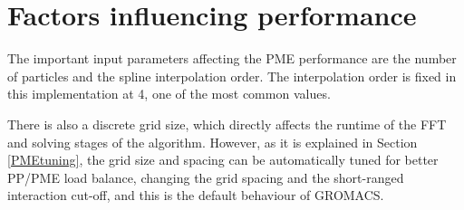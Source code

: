 \documentclass[12pt,a4paper,notitlepage]{report}
\newcommand{\draft}[1]{#1}
\begin{document}
\section{Factors influencing performance}



The important input parameters affecting the PME performance are the number of particles and the spline interpolation order.
The interpolation order is fixed in this implementation at 4, one of the most common values. %


There is also a discrete grid size, which directly affects the runtime of the FFT and solving stages of the algorithm. However, as it is explained in Section \ref{PMEtuning}, the grid size and spacing can be automatically tuned for better PP/PME load balance, changing the grid spacing and the short-ranged interaction cut-off, and this is the default behaviour of GROMACS. 




\end{document}
